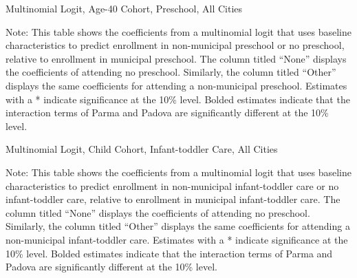 \begin{table}[H]
\centering
\caption{Multinomial Logit, Age-40 Cohort, Preschool,  All Cities} \label{mlogit_coeff_age40}
\begin{threeparttable}

\begin{tablenotes}
\footnotesize\raggedright{Note: This table shows the coefficients from a multinomial logit that uses baseline characteristics to predict enrollment in non-municipal preschool or no preschool, relative to enrollment in municipal preschool. The column titled ``None'' displays the coefficients of attending no preschool. Similarly, the column titled ``Other'' displays the same coefficients for attending a non-municipal preschool. Estimates with a * indicate significance at the 10\% level. Bolded  estimates indicate that the interaction terms of Parma and Padova are significantly different at the 10\% level.}
\end{tablenotes}
\end{threeparttable}
\end{table}

\begin{table}[H]
\centering
\caption{Multinomial Logit, Child Cohort,  Infant-toddler Care, All Cities} \label{mlogit_coeff_asilo_child}
\begin{threeparttable}

\begin{tablenotes}
\footnotesize\raggedright{Note: This table shows the coefficients from a multinomial logit that uses baseline characteristics to predict enrollment in non-municipal infant-toddler care or no infant-toddler care, relative to enrollment in municipal infant-toddler care. The column titled ``None'' displays the coefficients of attending no preschool. Similarly, the column titled ``Other'' displays the same coefficients for attending a non-municipal infant-toddler care. Estimates with a * indicate significance at the 10\% level. Bolded  estimates indicate that the interaction terms of Parma and Padova are significantly different at the 10\% level.}
\end{tablenotes}
\end{threeparttable}
\end{table}


